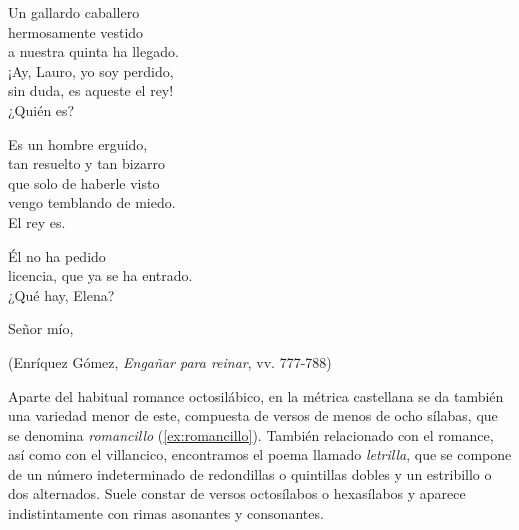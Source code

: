 \begin{exe}
	\ex\label{ex:romance}\begin{multicols}{2}Un gallardo caballero\\
	hermosamente vestido\\
	a nuestra quinta ha llegado.\\
	¡Ay, Lauro, yo soy perdido,\\
	sin duda, es aqueste el rey!\\
	¿Quién es?\\\strut\hspace{4em}Es un hombre erguido,\\
	tan resuelto y tan bizarro\\
	que solo de haberle visto\\
	vengo temblando de miedo.\\
	El rey es.\\
	\strut\hspace{4em}Él no ha pedido\\
	licencia, que ya se ha entrado.\\
	¿Qué hay, Elena?\\
	\strut\hspace{7em}Señor mío,\end{multicols}
	\strut\hfill(Enríquez Gómez, \textit{Engañar para reinar}, vv. 777-788\nocite{enriquez_enganarreinar})
\end{exe}
Aparte del habitual romance octosilábico, en la métrica castellana se da también una variedad menor de este, compuesta de versos de menos de ocho sílabas, que se denomina \textit{romancillo} (\ref{ex:romancillo}). También relacionado con el romance, así como con el villancico, encontramos el poema llamado \textit{letrilla}, que se compone de un número indeterminado de redondillas o quintillas dobles y un estribillo o dos alternados. Suele constar de versos octosílabos o hexasílabos y aparece indistintamente con rimas asonantes y consonantes. 


